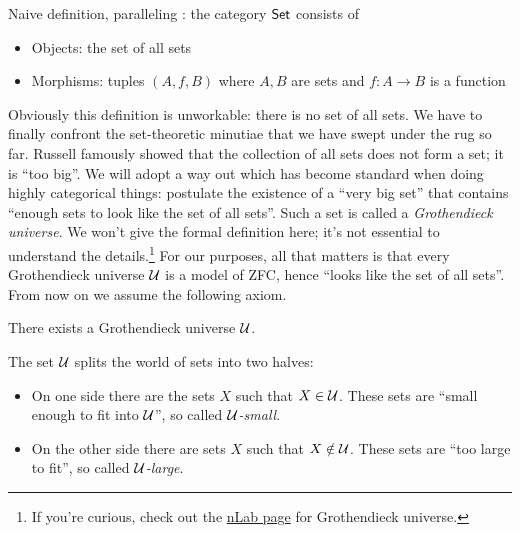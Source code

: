 Naive definition, paralleling : the category \(\mathsf{Set}\) consists of
\begin{itemize}
\item Objects: the set of all sets
\item Morphisms: tuples \((A,f,B)\) where \(A,B\) are sets and \(f : A \to B\) is a function
\end{itemize}
Obviously this definition is unworkable: there is no set of all sets.
We have to finally confront the set-theoretic minutiae that we have swept under the rug so far.
Russell famously showed that the collection of all sets does not form a set; it is ``too big''.
We will adopt a way out which has become standard when doing highly categorical things:
postulate the existence of a ``very big set'' that contains ``enough sets to look like the set of all sets''.
Such a set is called a \emph{Grothendieck universe}.
We won't give the formal definition here; it's not essential
to understand the details.\footnote{%
If you're curious, check out the
\href{https://ncatlab.org/nlab/show/Grothendieck+universe}{nLab page}
for Grothendieck universe.}
For our purposes, all that matters is that
every Grothendieck universe \(\mathcal U\) is a model of ZFC, hence ``looks like the set of all sets''.
From now on we assume the following axiom.
\begin{axiom}
  There exists a Grothendieck universe \(\mathcal U\).
\end{axiom}
The set \(\mathcal U\) splits the world of sets into two halves:
\begin{itemize}
\item On one side there are the sets \(X\) such that \(X \in \mathcal U\). These sets are ``small enough to fit into \(\mathcal U\)'', so called \emph{\(\mathcal U\)-small}.
\item On the other side there are sets \(X\) such that \(X \notin \mathcal U\). These sets are ``too large to fit'', so called \emph{\(\mathcal U\)-large}.
\end{itemize}

